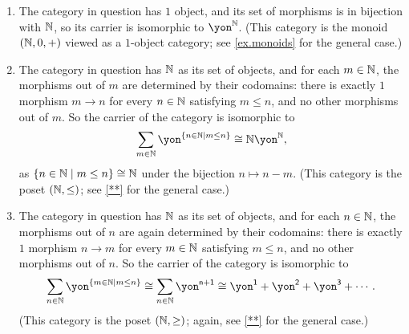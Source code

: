 \documentclass[Book-Poly]{subfiles}
\begin{document}
\begin{exercise}
\begin{solution}
\begin{enumerate}
	\item The category in question has $1$ object, and its set of morphisms is in bijection with $\mathbb{N}$, so its carrier is isomorphic to $\yon^\nn$.
	(This category is the monoid $(\mathbb{N},0,+)$ viewed as a $1$-object category; see \cref{ex.monoids} for the general case.)
	\item The category in question has $\mathbb{N}$ as its set of objects, and for each $m\in\mathbb{N}$, the morphisms out of $m$ are determined by their codomains: there is exactly $1$ morphism $m\to n$ for every $n\in\mathbb{N}$ satisfying $m\leq n$, and no other morphisms out of $m$.
	So the carrier of the category is isomorphic to
	\[
	    \sum_{m\in\nn}\yon^{\{n\in\nn\mid m\leq n\}}\iso\nn\yon^\nn,
	\]
	as $\{n\in\mathbb{N}\mid m\leq n\}\cong\mathbb{N}$ under the bijection $n\mapsto n-m$.
	(This category is the poset $(\mathbb{N},\leq)$; see \cref{**} for the general case.)
	\item The category in question has $\mathbb{N}$ as its set of objects, and for each $n\in\mathbb{N}$, the morphisms out of $n$ are again determined by their codomains: there is exactly $1$ morphism $n\to m$ for every $m\in\mathbb{N}$ satisfying $m\leq n$, and no other morphisms out of $n$.
	So the carrier of the category is isomorphic to
	\[
	    \sum_{n\in\nn}\yon^{\{m\in\nn\mid m\leq n\}}\iso\sum_{n\in\nn}\yon^{\ord{n+1}}\iso\yon^\1+\yon^\2+\yon^\3+\cdots.
	\]
    (This category is the poset $(\mathbb{N},\geq)$; again, see \cref{**} for the general case.)
\end{enumerate}
\end{solution}
\end{exercise}
\end{document}
